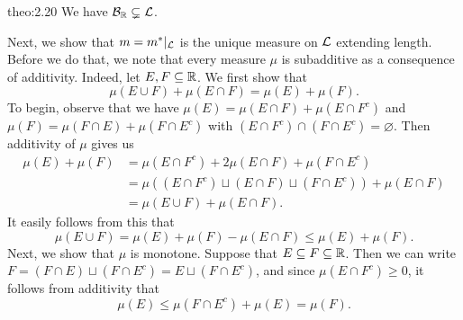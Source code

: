 \begin{theo}{theo:2.20}
    We have ${\cal B}_{\mathbb{R}} \subsetneq {\cal L}$. 
\end{theo}

Next, we show that $m = m^*|_{\cal L}$ is the unique measure on ${\cal L}$
extending length. Before we do that, we note that every measure $\mu$ is 
subadditive as a consequence of additivity. Indeed, let $E, F \subseteq \mathbb{R}$. 
We first show that
\[ \mu(E \cup F) + \mu(E \cap F) = \mu(E) + \mu(F). \] 
To begin, observe that we have $\mu(E) = \mu(E \cap F) + \mu(E \cap F^c)$ and 
$\mu(F) = \mu(F \cap E) + \mu(F \cap E^c)$ with $(E \cap F^c) 
\cap (F \cap E^c) = \varnothing$. Then additivity of $\mu$ gives us 
\begin{align*}
    \mu(E) + \mu(F) &= \mu(E \cap F^c) + 2\mu(E \cap F) + \mu(F \cap E^c) \\ 
    &= \mu((E \cap F^c) \sqcup (E \cap F) \sqcup (F \cap E^c)) + \mu(E \cap F) \\ 
    &= \mu(E \cup F) + \mu(E \cap F).
\end{align*}
It easily follows from this that 
\[ \mu(E \cup F) = \mu(E) + \mu(F) - \mu(E \cap F) \leq \mu(E) + \mu(F). \] 
Next, we show that $\mu$ is monotone. Suppose that $E \subseteq F 
\subseteq \mathbb{R}$. Then we can write $F = (F \cap E) \sqcup (F \cap E^c) = E 
\sqcup (F \cap E^c)$, and since $\mu(E \cap F^c) \geq 0$, it follows from 
additivity that 
\[ \mu(E) \leq \mu(F \cap E^c) + \mu(E) = \mu(F). \] 

